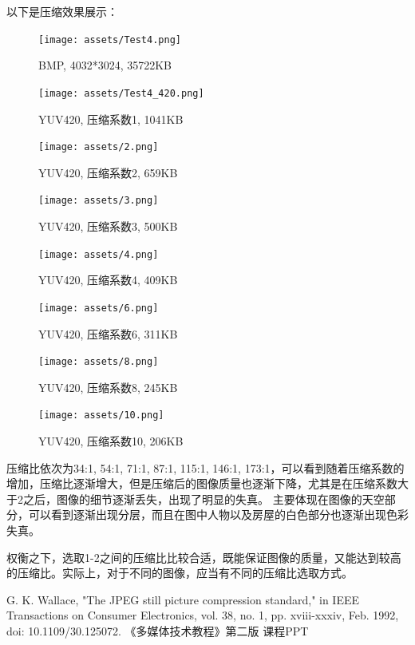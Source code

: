 \documentclass{article}
\begin{document}
以下是压缩效果展示：

\FloatBarrier
\begin{figure}[htbp]
    \centering
    \begin{minipage}[t]{0.45\textwidth}
        \centering
        \texttt{[image: assets/Test4.png]}
        \caption{BMP, 4032*3024, 35722KB}
    \end{minipage}
    \hfill  %
    \begin{minipage}[t]{0.45\textwidth}
        \centering
        \texttt{[image: assets/Test4\_420.png]}
        \caption{YUV420, 压缩系数1, 1041KB}
    \end{minipage}
    \hfill  %
    \begin{minipage}[t]{0.45\textwidth}
        \centering
        \texttt{[image: assets/2.png]}
        \caption{YUV420, 压缩系数2, 659KB}
    \end{minipage}
    \hfill  %
    \begin{minipage}[t]{0.45\textwidth}
        \centering
        \texttt{[image: assets/3.png]}
        \caption{YUV420, 压缩系数3, 500KB}
    \end{minipage}
    \hfill  %
    \begin{minipage}[t]{0.45\textwidth}
        \centering
        \texttt{[image: assets/4.png]}
        \caption{YUV420, 压缩系数4, 409KB}
    \end{minipage}
    \hfill  %
    \begin{minipage}[t]{0.45\textwidth}
        \centering
        \texttt{[image: assets/6.png]}
        \caption{YUV420, 压缩系数6, 311KB}
    \end{minipage}
    \hfill  %
    \begin{minipage}[t]{0.45\textwidth}
        \centering
        \texttt{[image: assets/8.png]}
        \caption{YUV420, 压缩系数8, 245KB}
    \end{minipage}
    \hfill  %
    \begin{minipage}[t]{0.45\textwidth}
        \centering
        \texttt{[image: assets/10.png]}
        \caption{YUV420, 压缩系数10, 206KB}
    \end{minipage}
\end{figure}
\FloatBarrier

压缩比依次为34:1, 54:1, 71:1, 87:1, 115:1, 146:1, 173:1，可以看到随着压缩系数的增加，压缩比逐渐增大，但是压缩后的图像质量也逐渐下降，尤其是在压缩系数大于2之后，图像的细节逐渐丢失，出现了明显的失真。
主要体现在图像的天空部分，可以看到逐渐出现分层，而且在图中人物以及房屋的白色部分也逐渐出现色彩失真。

权衡之下，选取1-2之间的压缩比比较合适，既能保证图像的质量，又能达到较高的压缩比。实际上，对于不同的图像，应当有不同的压缩比选取方式。

\begin{thebibliography}{9}
 G. K. Wallace, "The JPEG still picture compression standard," in IEEE Transactions on Consumer Electronics, vol. 38, no. 1, pp. xviii-xxxiv, Feb. 1992, doi: 10.1109/30.125072.
 《多媒体技术教程》第二版
 课程PPT
\end{thebibliography}
\end{document}
